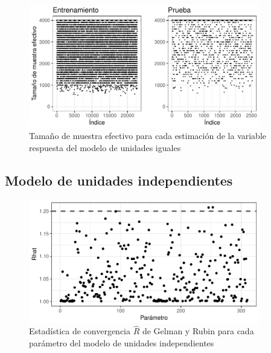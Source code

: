 \begin{figure}[H]
    \centering
    \includegraphics[width=0.9\textwidth]{images/comp_pooling_n_eff_yf.pdf}
    \caption{Tamaño de muestra efectivo para cada estimación de la variable respuesta del modelo de unidades iguales}
    \label{fig:comp_pooling_n_eff_yf}
\end{figure}



\subsection*{Modelo de unidades independientes}

\begin{figure}[H]
    \centering
    \includegraphics[width=0.9\textwidth]{images/no_pooling_r_statistic_params.pdf}
    \caption{Estadística de convergencia $\hat{R}$ de Gelman y Rubin para cada parámetro del modelo de unidades independientes}
    \label{fig:no_pooling_r_statistic_params}
\end{figure}

